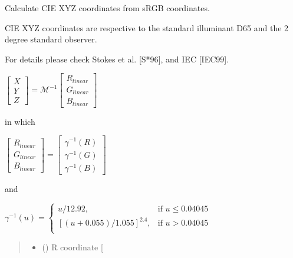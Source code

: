 \documentclass[letterpaper,10pt,english]{sphinxmanual}
\begin{document}
\begin{fulllineitems}
\label{\detokenize{07_colors:skinoptics.colors.XYZ_from_sRGB}}
\pysigstartsignatures
{}
\pysigstopsignatures
\begin{DUlineblock}{0em}
\item[] Calculate CIE XYZ coordinates from sRGB coordinates.
\item[] CIE XYZ coordinates are respective to the standard illuminant D65 and the 2 degree standard observer.
\item[] For details please check Stokes et al. {[}S*96{]}, and IEC {[}IEC99{]}.
\end{DUlineblock}

\sphinxAtStartPar
\(\begin{bmatrix}
X \\
Y \\
Z
\end{bmatrix}
=
\mathcal{M}^{-1}
\begin{bmatrix}
R_{linear} \\
G_{linear} \\
B_{linear}
\end{bmatrix}\)

\sphinxAtStartPar
in which

\sphinxAtStartPar
\(\begin{bmatrix}
R_{linear} \\
G_{linear} \\
B_{linear}
\end{bmatrix}
=
\begin{bmatrix}
\gamma^{-1}(R) \\
\gamma^{-1}(G) \\
\gamma^{-1}(B)
\end{bmatrix}\)

\sphinxAtStartPar
and

\sphinxAtStartPar
\(\gamma^{-1}(u) =  
\left \{ \begin{matrix}
u/12.92, & \mbox{if } u \le 0.04045 \\
[(u + 0.055)/1.055]^{2.4}, & \mbox{if } u > 0.04045 \\
\end{matrix} \right.\)
\begin{quote}\begin{description}
\begin{itemize}
\item {} 
\sphinxAtStartPar
{} () \textendash{} R coordinate {[}\sphinxhyphen{}{]}


\end{itemize}
\end{description}
\end{quote}
\end{fulllineitems}
\end{document}
